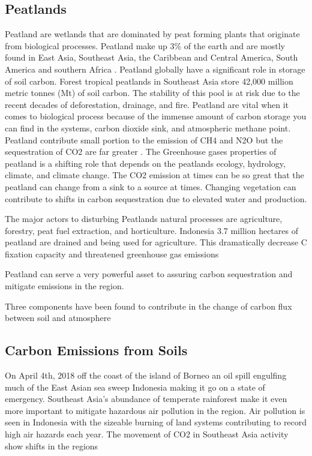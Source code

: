 \subsection {Peatlands}
Peatland are wetlands that are dominated by peat forming plants that originate from biological processes. Peatland make up 3\% of the earth and are mostly found in East Asia, Southeast Asia, the Caribbean and Central America, South America and southern Africa \citep{strack2008peatlands}. Peatland globally have a  significant role in storage of soil carbon. Forest tropical peatlands in Southeast Asia store 42,000 million metric tonnes (Mt) of soil carbon. The stability of this pool is at risk due to the recent decades of deforestation, drainage, and fire. Peatland are vital when it comes to biological process because of the immense amount of carbon storage you can find in the systems, carbon dioxide sink, and atmospheric methane point. Peatland contribute small portion to the emission of CH4  and N2O but the sequestration of CO2 are far greater \citep{strack2008peatlands}. The Greenhouse gases properties of peatland is a shifting role that depends on the peatlands ecology, hydrology, climate, and climate change. The CO2 emission at times can be so great that the peatland can change from a sink to a source at times. Changing vegetation can contribute to shifts in carbon sequestration due to elevated water and production.

The major actors to disturbing Peatlands natural processes  are agriculture, forestry, peat fuel extraction, and horticulture.  Indonesia 3.7 million hectares of peatland are drained and being used for agriculture. This dramatically decrease C fixation capacity and threatened greenhouse gas emissions

Peatland can serve a very powerful asset to assuring carbon sequestration and mitigate emissions in the region.

Three components have been found to contribute in the change of carbon flux between soil and atmosphere


\subsection {Carbon Emissions from Soils}

On April 4th, 2018 off the coast of the island of Borneo an oil spill engulfing much of the East Asian sea sweep Indonesia making it go on a state of emergency. Southeast Asia's abundance of temperate rainforest make it even more important to mitigate hazardous air pollution in the region. Air pollution is seen in Indonesia with the sizeable burning of land systems contributing to record high air hazards each year. The movement of CO2 in Southeast Asia activity show shifts in the regions 

